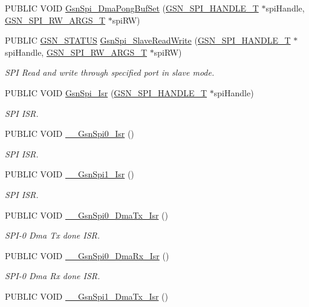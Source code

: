 \begin{DoxyCompactItemize}
PUBLIC VOID \hyperlink{a00587_a53b71435edc8c235f4090408d1f10e37}{GsnSpi\_\-DmaPongBufSet} (\hyperlink{a00238}{GSN\_\-SPI\_\-HANDLE\_\-T} $\ast$spiHandle, \hyperlink{a00239}{GSN\_\-SPI\_\-RW\_\-ARGS\_\-T} $\ast$spiRW)
\item 
PUBLIC \hyperlink{a00660_gada5951904ac6110b1fa95e51a9ddc217}{GSN\_\-STATUS} \hyperlink{a00655_ga5733034f9b6e7a4307c9a42ae94ff331}{GsnSpi\_\-SlaveReadWrite} (\hyperlink{a00238}{GSN\_\-SPI\_\-HANDLE\_\-T} $\ast$spiHandle, \hyperlink{a00239}{GSN\_\-SPI\_\-RW\_\-ARGS\_\-T} $\ast$spiRW)
\begin{DoxyCompactList}\small\item\em SPI Read and write through specified port in slave mode. \end{DoxyCompactList}\item 
PUBLIC VOID \hyperlink{a00655_ga91cf5c4e81e474090b72a663d3d437bd}{GsnSpi\_\-Isr} (\hyperlink{a00238}{GSN\_\-SPI\_\-HANDLE\_\-T} $\ast$spiHandle)
\begin{DoxyCompactList}\small\item\em SPI ISR. \end{DoxyCompactList}\item 
PUBLIC VOID \hyperlink{a00655_ga585c3c7cf57beb1410b51729bbdf825c}{\_\-\_\-GsnSpi0\_\-Isr} ()
\begin{DoxyCompactList}\small\item\em SPI ISR. \end{DoxyCompactList}\item 
PUBLIC VOID \hyperlink{a00655_ga352836cc21d953411e38fb2e90d01ac9}{\_\-\_\-GsnSpi1\_\-Isr} ()
\begin{DoxyCompactList}\small\item\em SPI ISR. \end{DoxyCompactList}\item 
PUBLIC VOID \hyperlink{a00655_ga43402383d3c4b3bb50c9c34b88002a3c}{\_\-\_\-GsnSpi0\_\-DmaTx\_\-Isr} ()
\begin{DoxyCompactList}\small\item\em SPI-\/0 Dma Tx done ISR. \end{DoxyCompactList}\item 
PUBLIC VOID \hyperlink{a00655_gaba6d8c77f5e7adba7afcf924c990f566}{\_\-\_\-GsnSpi0\_\-DmaRx\_\-Isr} ()
\begin{DoxyCompactList}\small\item\em SPI-\/0 Dma Rx done ISR. \end{DoxyCompactList}\item 
PUBLIC VOID \hyperlink{a00655_gae57fcc9dca6abd4efbe45a144676b268}{\_\-\_\-GsnSpi1\_\-DmaTx\_\-Isr} ()

\end{DoxyCompactItemize}
